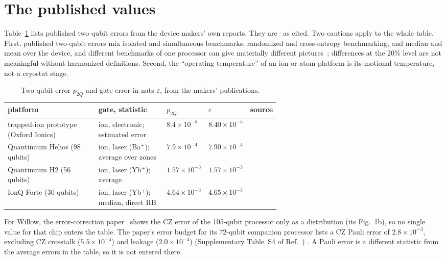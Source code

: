 \section{The published values}

Table~\ref{tab:platforms} lists published two-qubit errors from the device makers' own reports. They are \observed\ as cited. Two cautions apply to
the whole table. First, published two-qubit errors mix isolated and simultaneous benchmarks,
randomized and cross-entropy benchmarking, and median and mean over the device, and different benchmarks of one processor can give
materially different pictures~\cite{Proctor2022}; differences at the 20\% level are not meaningful without harmonized definitions. Second, the
``operating temperature'' of an ion or atom platform is its motional temperature, not a cryostat stage.

\begin{table}[htbp]\centering\small
\caption{Two-qubit error $p_{2Q}$ and gate error in nats $\varepsilon$, from the makers' publications.}\label{tab:platforms}
\begin{tabularx}{\linewidth}{@{}>{\raggedright\arraybackslash}X>{\raggedright\arraybackslash}p{0.25\linewidth}>{\raggedright\arraybackslash}p{0.14\linewidth}>{\raggedright\arraybackslash}p{0.14\linewidth}>{\raggedright\arraybackslash}p{0.09\linewidth}@{}}\toprule
platform & gate, statistic & $p_{2Q}$ & $\varepsilon$ & source \\\midrule
trapped-ion prototype (Oxford Ionics) & ion, electronic; estimated error & $8.4\times10^{-5}$ & $8.40\times10^{-5}$ & \cite{Hughes2025} \\
Quantinuum Helios (98 qubits) & ion, laser (Ba$^+$); average over zones & $7.9\times10^{-4}$ & $7.90\times10^{-4}$ & \cite{Ransford2025} \\
Quantinuum H2 (56 qubits) & ion, laser (Yb$^+$); average & $1.57\times10^{-3}$ & $1.57\times10^{-3}$ & \cite{DeCross2025} \\
IonQ Forte (30 qubits) & ion, laser (Yb$^+$); median, direct RB & $4.64\times10^{-3}$ & $4.65\times10^{-3}$ & \cite{Chen2024Forte} \\\bottomrule
\end{tabularx}
\end{table}
\noindent For Willow, the error-correction paper~\cite{GoogleWillow2025} shows the CZ error of the 105-qubit processor only as a distribution
(its Fig.~1b), so no single value for that chip enters the table. The paper's error budget for its 72-qubit companion processor lists a CZ
Pauli error of $2.8\times10^{-3}$, excluding CZ crosstalk ($5.5\times10^{-4}$) and leakage ($2.0\times10^{-4}$) (Supplementary Table~S4 of
Ref.~\cite{GoogleWillow2025}) \observed. A Pauli error is a different statistic from the average errors in the table, so it is not entered
there.

